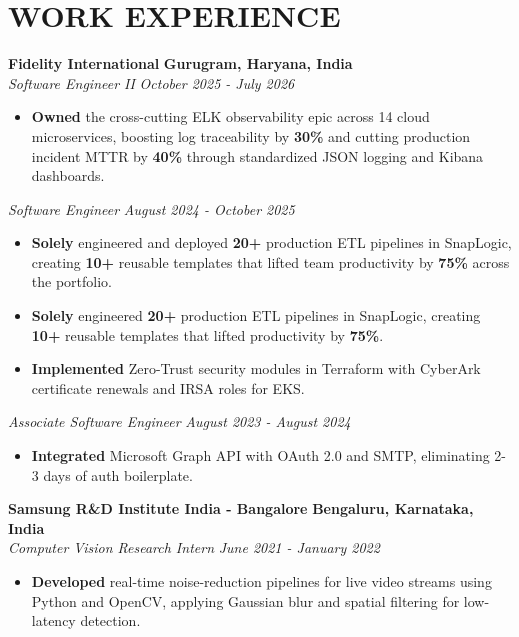 \documentclass[10pt,a4paper]{article}
\begin{document}
\section*{WORK EXPERIENCE}
\noindent \textbf{Fidelity International} \hfill \textbf{Gurugram, Haryana, India} \\
\textit{Software Engineer II} \hfill \textit{October 2025 - July 2026}
\begin{itemize}
\item \textbf{Owned} the cross-cutting ELK observability epic across 14 cloud microservices, boosting log traceability by \textbf{30\%} and cutting production incident MTTR by \textbf{40\%} through standardized JSON logging and Kibana dashboards.
\end{itemize}
\vspace{1pt}
\textit{Software Engineer} \hfill \textit{August 2024 - October 2025}
\begin{itemize}
\item \textbf{Solely} engineered and deployed \textbf{20+} production ETL pipelines in SnapLogic, creating \textbf{10+} reusable templates that lifted team productivity by \textbf{75\%} across the portfolio.
\item \textbf{Solely} engineered \textbf{20+} production ETL pipelines in SnapLogic, creating \textbf{10+} reusable templates that lifted productivity by \textbf{75\%}.
\item \textbf{Implemented} Zero-Trust security modules in Terraform with CyberArk certificate renewals and IRSA roles for EKS.
\end{itemize}
\vspace{1pt}
\textit{Associate Software Engineer} \hfill \textit{August 2023 - August 2024}
\begin{itemize}
\item \textbf{Integrated} Microsoft Graph API with OAuth 2.0 and SMTP, eliminating 2-3 days of auth boilerplate.
\end{itemize}
\vspace{2pt}
\noindent \textbf{Samsung R\&D Institute India - Bangalore} \hfill \textbf{Bengaluru, Karnataka, India} \\
\textit{Computer Vision Research Intern} \hfill \textit{June 2021 - January 2022}
\begin{itemize}
\item \textbf{Developed} real-time noise-reduction pipelines for live video streams using Python and OpenCV, applying Gaussian blur and spatial filtering for low-latency detection.
\end{itemize}
\end{document}
